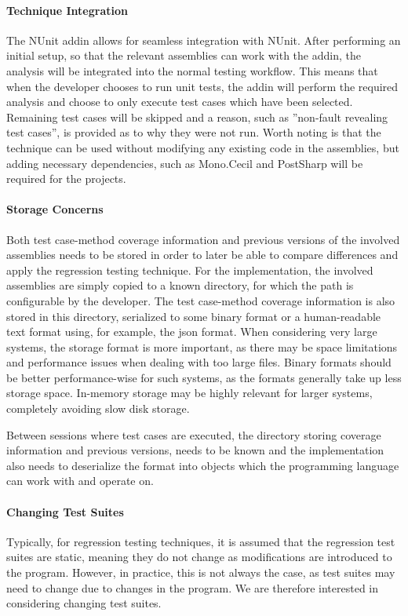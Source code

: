 \documentclass[a4paper,english,12pt]{report}
\begin{document}
\paragraph{Technique Integration}
The NUnit addin allows for seamless integration with NUnit. After performing an initial setup, so that the relevant assemblies can work with the addin, the analysis will be integrated into the normal testing workflow. This means that when the developer chooses to run unit tests, the addin will perform the required analysis and choose to only execute test cases which have been selected. Remaining test cases will be skipped and a reason, such as ''non-fault revealing test cases'', is provided as to why they were not run. Worth noting is that the technique can be used without modifying any existing code in the assemblies, but adding necessary dependencies, such as Mono.Cecil and PostSharp will be required for the projects.

\paragraph{Storage Concerns}
Both test case-method coverage information and previous versions of the involved assemblies needs to be stored in order to later be able to compare differences and apply the regression testing technique. For the implementation, the involved assemblies are simply copied to a known directory, for which the path is configurable by the developer. The test case-method coverage information is also stored in this directory, serialized to some binary format or a human-readable text format using, for example, the \gls{json} format. When considering very large systems, the storage format is more important, as there may be space limitations and performance issues when dealing with too large files. Binary formats should be better performance-wise for such systems, as the formats generally take up less storage space. In-memory storage may be highly relevant for larger systems, completely avoiding slow disk storage.

Between sessions where test cases are executed, the directory storing coverage information and previous versions, needs to be known and the implementation also needs to deserialize the format into objects which the programming language can work with and operate on.

\paragraph{Changing Test Suites}
Typically, for regression testing techniques, it is assumed that the regression test suites are static, meaning they do not change as modifications are introduced to the program. However, in practice, this is not always the case, as test suites may need to change due to changes in the program. We are therefore interested in considering changing test suites.
\end{document}

